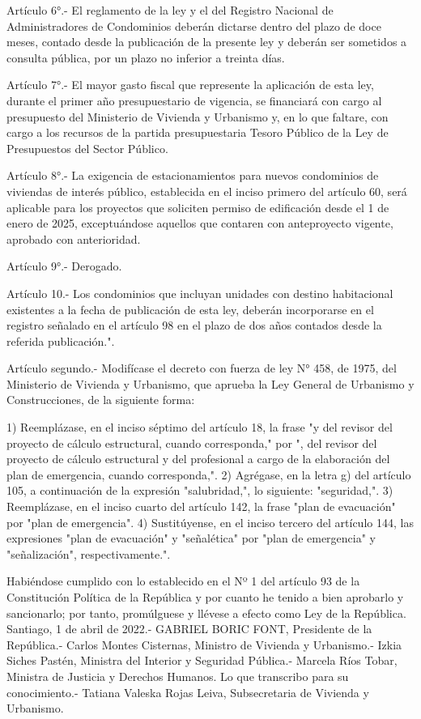     Artículo 6°.- El reglamento de la ley y el del Registro Nacional de Administradores de Condominios deberán dictarse dentro del plazo de doce meses, contado desde la publicación de la presente ley y deberán ser sometidos a consulta pública, por un plazo no inferior a treinta días.
     
    Artículo 7°.- El mayor gasto fiscal que represente la aplicación de esta ley, durante el primer año presupuestario de vigencia, se financiará con cargo al presupuesto del Ministerio de Vivienda y Urbanismo y, en lo que faltare, con cargo a los recursos de la partida presupuestaria Tesoro Público de la Ley de Presupuestos del Sector Público.
     
    Artículo 8°.- La exigencia de estacionamientos para nuevos condominios de viviendas de interés público, establecida en el inciso primero del artículo 60, será aplicable para los proyectos que soliciten permiso de edificación desde el 1 de enero de 2025, exceptuándose aquellos que contaren con anteproyecto vigente, aprobado con anterioridad.


    Artículo 9°.- Derogado.


     
    Artículo 10.- Los condominios que incluyan unidades con destino habitacional existentes a la fecha de publicación de esta ley, deberán incorporarse en el registro señalado en el artículo 98 en el plazo de dos años contados desde la referida publicación.".

    Artículo segundo.- Modifícase el decreto con fuerza de ley N° 458, de 1975, del Ministerio de Vivienda y Urbanismo, que aprueba la Ley General de Urbanismo y Construcciones, de la siguiente forma:
     
    1) Reemplázase, en el inciso séptimo del artículo 18, la frase "y del revisor del proyecto de cálculo estructural, cuando corresponda," por ", del revisor del proyecto de cálculo estructural y del profesional a cargo de la elaboración del plan de emergencia, cuando corresponda,".
    2) Agrégase, en la letra g) del artículo 105, a continuación de la expresión "salubridad,", lo siguiente: "seguridad,".
    3) Reemplázase, en el inciso cuarto del artículo 142, la frase "plan de evacuación" por "plan de emergencia".
    4) Sustitúyense, en el inciso tercero del artículo 144, las expresiones "plan de evacuación" y "señalética" por "plan de emergencia" y "señalización", respectivamente.".


      Habiéndose cumplido con lo establecido en el Nº 1 del artículo 93 de la Constitución Política de la República y por cuanto he tenido a bien aprobarlo y sancionarlo; por tanto, promúlguese y llévese a efecto como Ley de la República.   
    Santiago, 1 de abril de 2022.- GABRIEL BORIC FONT, Presidente de la República.- Carlos Montes Cisternas, Ministro de Vivienda y Urbanismo.- Izkia Siches Pastén, Ministra del Interior y Seguridad Pública.- Marcela Ríos Tobar, Ministra de Justicia y Derechos Humanos.
    Lo que transcribo para su conocimiento.- Tatiana Valeska Rojas Leiva, Subsecretaria de Vivienda y Urbanismo.
     
